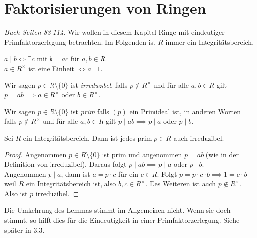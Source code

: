 \graphicspath{{Images/}}

\chapter{Faktorisierungen von Ringen}
\emph{Buch Seiten 83-114}.
Wir wollen in diesem Kapitel Ringe mit eindeutiger Primfaktorzerlegung betrachten.
Im Folgenden ist $R$ immer ein Integritätsbereich.

\begin{definition}[Wiederholung]
	$a \mid b \Leftrightarrow \exists  c $ mit $b=ac$ für $a,b \in R$.\\
	$a \in R^{\times}$ ist eine Einheit $\Leftrightarrow a \mid 1$.
\end{definition}

\begin{definition}
	Wir sagen $p \in R \setminus \{0\}$ ist \emph{irreduzibel}, falls $p \not\in R^{\times}$ und für alle $a,b \in R$ gilt
	$p = ab \implies a \in R^{\times}$ oder $b \in R^{\times}$.
\end{definition}

\begin{definition}
	Wir sagen $p \in R \setminus \{0\}$ ist \emph{prim} falls $(p)$ ein Primideal ist, in anderen Worten
	falls $p \not\in R^{\times}$ und für alle $a,b \in R$ gilt $p \mid ab \implies p \mid a$ oder $p \mid b$.
\end{definition}

\begin{lemma}
	Sei $R$ ein Integritätsbereich. Dann ist jedes prim $p \in R$ auch irreduzibel.
\end{lemma}

\begin{proof}
	Angenommen $p \in R \setminus \{0\} $ ist prim und angenommen $p =ab$ (wie in der Definition von irreduzibel).
	Daraus folgt $p \mid ab \implies p \mid a $ oder $p \mid b$.\\
	Angenommen $p \mid a$, dann ist $a = p \cdot c$ für ein $c \in R$.
	Folgt $p = p \cdot c \cdot b \implies 1 = c \cdot b$ weil $R$ ein Integritätsbereich ist, also $b,c \in R^{\times}$.
	Des Weiteren ist auch $p \not\in  R^{\times}$. Also ist $p$ irreduzibel.
\end{proof}

\begin{remark}
	Die Umkehrung des Lemmas stimmt im Allgemeinen nicht.
	Wenn sie doch stimmt, so hilft dies für die Eindeutigkeit in einer Primfaktorzerlegung.
	Siehe später in 3.3.
\end{remark}

